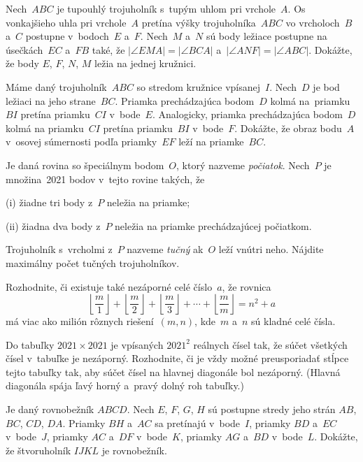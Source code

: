 {%
Nech~$ABC$ je tupouhlý trojuholník s~tupým uhlom pri vrchole~$A$. Os vonkajšieho uhla pri vrchole~$A$ pretína výšky trojuholníka~$ABC$ vo vrcholoch~$B$ a~$C$ postupne v~bodoch~$E$ a~$F$. Nech~$M$ a~$N$ sú body ležiace postupne na úsečkách~$EC$ a~$FB$ také, že $|\angle EMA| = |\angle BCA|$ a~$|\angle ANF| = |\angle ABC|$. Dokážte, že body $E$, $F$, $N$, $M$ ležia na jednej kružnici.
}

{%
Máme daný trojuholník~$ABC$ so stredom kružnice vpísanej~$I$. Nech~$D$ je bod ležiaci na jeho strane~$BC$. Priamka prechádzajúca bodom~$D$ kolmá na~priamku~$BI$ pretína priamku~$CI$ v~bode~$E$. Analogicky, priamka prechádzajúca bodom~$D$ kolmá na priamku~$CI$ pretína priamku~$BI$ v~bode~$F$. Dokážte, že obraz bodu~$A$ v~osovej súmernosti podľa priamky~$EF$ leží na priamke~$BC$.
}

{%
Je daná rovina so špeciálnym bodom~$O$, ktorý nazveme \emph{počiatok}. Nech~$P$ je množina~2021 bodov v~tejto rovine takých, že
\item{(i)} žiadne tri body z~$P$ neležia na priamke;
\item{(ii)} žiadna dva body z~$P$ neležia na priamke prechádzajúcej počiatkom.

Trojuholník s~vrcholmi z~$P$ nazveme \emph{tučný} ak~$O$ leží vnútri neho. Nájdite maximálny počet tučných trojuholníkov.
}

{%
Rozhodnite, či existuje také nezáporné celé číslo~$a$, že rovnica
$$
\left\lfloor\frac{m}{1}\right\rfloor + \left\lfloor\frac{m}{2}\right\rfloor +
\left\lfloor\frac{m}{3}\right\rfloor + \cdots +
\left\lfloor\frac{m}{m}\right\rfloor = n^2 + a
$$
má viac ako milión rôznych riešení~$(m,n)$, kde~$m$ a~$n$ sú kladné celé čísla.
}

{%
 Do tabuľky $2021 \times 2021$ je vpísaných $2021^2$ reálnych čísel tak, že súčet všetkých čísel v~tabuľke je nezáporný. Rozhodnite, či je vždy možné preusporiadať stĺpce tejto tabuľky tak, aby súčet čísel na hlavnej diagonále bol nezáporný. (Hlavná diagonála spája ľavý horný a~pravý dolný roh tabuľky.)
}

{%
Je daný rovnobežník $ABCD$. Nech $E$, $F$, $G$, $H$ sú postupne stredy jeho strán $AB$, $BC$, $CD$, $DA$. Priamky $BH$ a~$AC$ sa pretínajú v~bode~$I$, priamky $BD$ a~$EC$ v~bode~$J$, priamky $AC$ a~$DF$ v~bode~$K$, priamky $AG$ a~$BD$ v~bode~$L$. Dokážte, že štvoruholník $IJKL$ je rovnobežník.
}

